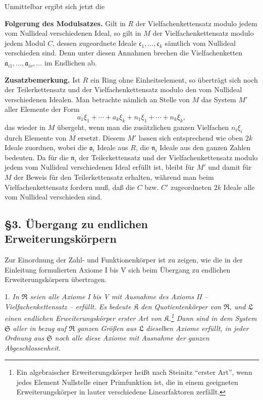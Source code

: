 \documentclass[11pt]{article}
\providecommand{\mR}{\mathfrak{R}}
\providecommand{\mK}{\mathfrak{K}}
\providecommand{\mL}{\mathfrak{L}}
\providecommand{\mS}{\mathfrak{S}}
\begin{document}
Unmittelbar ergibt sich jetzt die

\medskip
\noindent\textbf{Folgerung des Modulsatzes.} Gilt in $R$ der
Vielfachenkettensatz modulo jedem vom Nullideal verschiedenen Ideal, so gilt in
$M$ der Vielfachenkettensatz modulo jedem Modul $C$, dessen zugeordnete Ideale
$\mathfrak c_1,\ldots,\mathfrak c_k$ sämtlich vom Nullideal verschieden sind.
Denn unter diesen Annahmen brechen die Vielfachenketten
$\mathfrak a_{i1},\ldots,\mathfrak a_{i\nu},\ldots$ im Endlichen ab.

\medskip
\noindent\textbf{Zusatzbemerkung.} Ist $R$ ein Ring ohne Einheitselement, so
überträgt sich noch der Teilerkettensatz und der Vielfachenkettensatz modulo den
vom Nullideal verschiedenen Idealen. Man betrachte nämlich an Stelle von $M$ das
System $M'$ aller Elemente der Form
\[
        a_1\xi_1+\cdots+a_k\xi_k+n_1\xi_1+\cdots+n_k\xi_k,
\]
das wieder in $M$ übergeht, wenn man die zusätzlichen ganzen Vielfachen
$n_i\xi_i$ durch Elemente von $M$ ersetzt. Diesem $M'$ lassen sich entsprechend
wie oben $2k$ Ideale zuordnen, wobei die $\mathfrak a_i$ Ideale aus $R$, die
$\mathfrak n_i$ Ideale aus den ganzen Zahlen bedeuten. Da für die
$\mathfrak n_i$ der Teilerkettensatz und der Vielfachenkettensatz modulo jedem
vom Nullideal verschiedenen Ideal erfüllt ist, bleibt für $M'$ und damit für $M$
der Beweis für den Teilerkettensatz erhalten, während man beim
Vielfachenkettensatz fordern muß, daß die $C$ bzw. $C'$ zugeordneten $2k$ Ideale
alle vom Nullideal verschieden sind.

\setcounter{footnote}{13}

\subsection*{§3. Übergang zu endlichen Erweiterungskörpern}

Zur Einordnung der Zahl- und Funktionenkörper ist zu zeigen, wie die in der Einleitung formulierten Axiome I bis V sich beim Übergang zu endlichen Erweiterungskörpern übertragen.

1. \emph{In $\mR$ seien alle Axiome I bis V mit Ausnahme des Axioms II -- Vielfachenkettensatz -- erfüllt. Es bedeute $\mK$ den Quotientenkörper von $\mR$, und $\mL$ einen endlichen Erweiterungskörper erster Art von $\mK$.\footnote{Ein algebraischer Erweiterungskörper heißt nach Steinitz ``erster Art'', wenn jedes Element Nullstelle einer Primfunktion ist, die in einem geeigneten Erweiterungskörper in lauter verschiedene Linearfaktoren zerfällt.} Dann sind in dem System $\mS$ aller in bezug auf $\mR$ ganzen Größen aus $\mL$ dieselben Axiome erfüllt, in jeder Ordnung aus $\mS$ noch alle diese Axiome mit Ausnahme der ganzen Abgeschlossenheit.}
\end{document}
